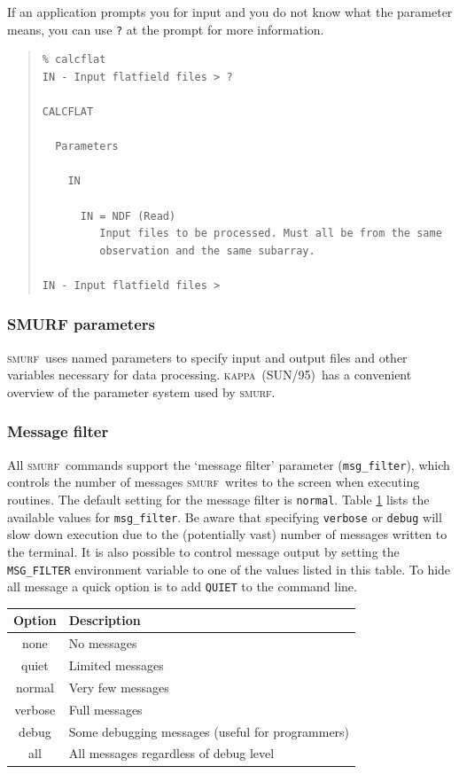 \documentclass[twoside,11pt]{article}
\newcommand{\xref}[3]{#1}
\renewcommand{\_}{\texttt{\symbol{95}}}
\newenvironment{myquote}{\begin{quote}\begin{small}}{\end{small}\end{quote}}
\newcommand{\KAPPA}{\textsc{kappa}}
\newcommand{\KAPPAref}{\xref{(SUN/95)}{sun95}{}}
\newcommand{\SMURF}{\textsc{smurf}}
\begin{document}
If an application prompts you for input and you do not know what the
parameter means, you can use \verb+?+ at the prompt for more
information.

\begin{myquote}
\begin{verbatim}
% calcflat
IN - Input flatfield files > ?

CALCFLAT

  Parameters

    IN

      IN = NDF (Read)
         Input files to be processed. Must all be from the same
         observation and the same subarray.

IN - Input flatfield files >
\end{verbatim}
\end{myquote}

\subsubsection{SMURF parameters}

\SMURF\ uses named parameters to specify input and output files and
other variables necessary for data processing. \KAPPA\ \KAPPAref\ has a
convenient overview of the parameter system used by \SMURF.

\subsubsection{Message filter}

All \SMURF\ commands support the `message filter' parameter
(\verb+msg_filter+), which controls the number of messages \SMURF\
writes to the screen when executing routines. The default setting for
the message filter is \verb+normal+. Table \ref{tab:msgfilter} lists
the available values for \verb+msg_filter+. Be aware that specifying
\verb+verbose+ or \verb+debug+ will slow down execution due to the
(potentially vast) number of messages written to the terminal. It is
also possible to control message output by setting the
\verb+MSG_FILTER+ environment variable to one of the values listed in
this table. To hide all message a quick option is to add \verb+QUIET+
to the command line.

\begin{table}
\centering
\begin{tabular}{|c|l|}
\hline
Option  & Description \\
\hline
none    & No messages \\
quiet   & Limited messages \\
normal  & Very few messages \\
verbose & Full messages \\
debug   & Some debugging messages (useful for programmers) \\
all     & All messages regardless of debug level \\
\hline
\end{tabular}
\label{tab:msgfilter}
\end{table}
\end{document}
